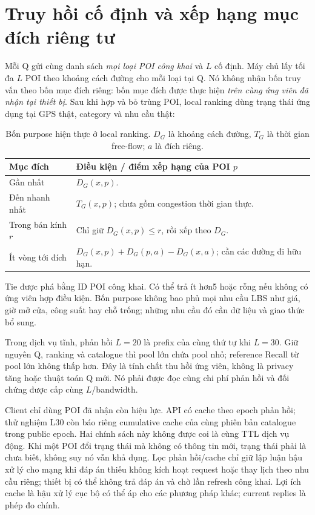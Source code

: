 \section{Truy hồi cố định và xếp hạng mục đích riêng tư}
\label{sec:current-local-purpose}

Mỗi Q gửi cùng danh sách \emph{mọi loại POI công khai} và $L$ cố định. Máy chủ lấy tối đa $L$ POI theo khoảng cách đường cho mỗi loại tại Q. Nó không nhận bốn truy vấn theo bốn mục đích riêng: bốn mục đích được thực hiện \emph{trên cùng ứng viên đã nhận tại thiết bị}. Sau khi hợp và bỏ trùng POI, local ranking dùng trạng thái ứng dụng tại GPS thật, category và nhu cầu thật:
\begin{table}[H]\centering\small
\caption{Bốn purpose hiện thực ở local ranking. $D_G$ là khoảng cách đường, $T_G$ là thời gian free-flow; $a$ là đích riêng.}
\begin{tabularx}{\textwidth}{P{3.3cm}Y}\toprule
Mục đích & Điều kiện / điểm xếp hạng của POI $p$\\\midrule
Gần nhất & $D_G(x,p)$.\\
Đến nhanh nhất & $T_G(x,p)$; chưa gồm congestion thời gian thực.\\
Trong bán kính $r$ & Chỉ giữ $D_G(x,p)\leq r$, rồi xếp theo $D_G$.\\
Ít vòng tới đích & $D_G(x,p)+D_G(p,a)-D_G(x,a)$; cần các đường đi hữu hạn.\\\bottomrule
\end{tabularx}
\end{table}
Tie được phá bằng ID POI công khai. Có thể trả ít hơn5 hoặc rỗng nếu không có ứng viên hợp điều kiện. Bốn purpose không bao phủ mọi nhu cầu LBS như giá, giờ mở cửa, công suất hay chỗ trống; những nhu cầu đó cần dữ liệu và giao thức bổ sung.

Trong dịch vụ tĩnh, phản hồi $L=20$ là prefix của cùng thứ tự khi $L=30$. Giữ nguyên Q, ranking và catalogue thì pool lớn chứa pool nhỏ; reference Recall từ pool lớn không thấp hơn. Đây là tính chất thu hồi ứng viên, không là privacy tăng hoặc thuật toán Q mới. Nó phải được đọc cùng chi phí phản hồi và đối chứng được cấp cùng $L$/bandwidth.

Client chỉ dùng POI đã nhận còn hiệu lực. API có cache theo epoch phản hồi; thử nghiệm L30 còn báo riêng cumulative cache của cùng phiên bản catalogue trong public epoch. Hai chính sách này không được coi là cùng TTL dịch vụ động. Khi một POI đổi trạng thái mà không có thông tin mới, trạng thái phải là chưa biết, không suy nó vẫn khả dụng. Lọc phản hồi/cache chỉ giữ lập luận hậu xử lý cho mạng khi đáp án thiếu không kích hoạt request hoặc thay lịch theo nhu cầu riêng; thiết bị có thể không trả đáp án và chờ lần refresh công khai. Lợi ích cache là hậu xử lý cục bộ có thể áp cho các phương pháp khác; current replies là phép đo chính.

